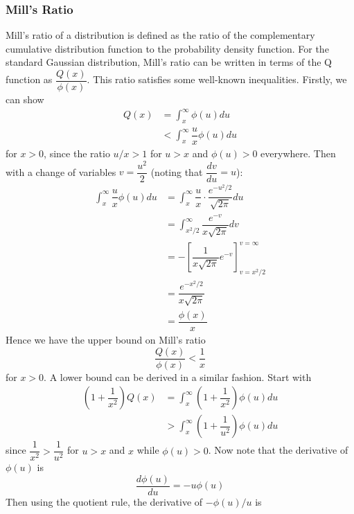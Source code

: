 \documentclass[11pt]{report} %
\begin{document}
\subsubsection{Mill's Ratio}

Mill's ratio of a distribution is defined as the ratio of the complementary cumulative distribution function to the probability density function. For the standard Gaussian distribution, Mill's ratio can be written in terms of the Q function as $\dfrac{Q\left(x\right)}{\phi\left(x\right)}$. This ratio satisfies some well-known inequalities. Firstly, we can show
\begin{align}
Q\left(x\right) &= \int_{x}^{\infty}\phi\left(u\right)du \\
& < \int_{x}^{\infty}\dfrac{u}{x}\phi\left(u\right)du
\end{align}
for $x > 0$, since the ratio $u/x > 1$ for $u > x$ and $\phi\left(u\right) > 0$ everywhere. Then with a change of variables $v = \dfrac{u^{2}}{2}$ (noting that $\dfrac{dv}{du} = u$):
\begin{align}
\int_{x}^{\infty}\dfrac{u}{x}\phi\left(u\right)du &= \int_{x}^{\infty}\dfrac{u}{x}\cdot \dfrac{e^{-u^{2}/2}}{\sqrt{2\pi}}du \\
&= \int_{x^{2}/2}^{\infty}\dfrac{e^{-v}}{x\sqrt{2\pi}}dv \\
&= -\left[\dfrac{1}{x\sqrt{2\pi}}e^{-v}\right]_{v=x^{2}/2}^{v = \infty} \\
&= \dfrac{e^{-x^{2}/2}}{x\sqrt{2\pi}} \\
&= \dfrac{\phi\left(x\right)}{x}
\end{align}
Hence we have the upper bound on Mill's ratio
\begin{equation}
\dfrac{Q\left(x\right)}{\phi\left(x\right)} < \dfrac{1}{x}
\end{equation}
for $x > 0$. A lower bound can be derived in a similar fashion. Start with
\begin{align}
\left(1 + \dfrac{1}{x^{2}}\right)Q\left(x\right) &= \int_{x}^{\infty}\left(1 + \dfrac{1}{x^{2}}\right)\phi\left(u\right)du \\
&> \int_{x}^{\infty}\left(1 + \dfrac{1}{u^{2}}\right)\phi\left(u\right)du
\end{align}
since $\dfrac{1}{x^{2}} > \dfrac{1}{u^{2}}$ for $u > x$ and $x$ while $\phi\left(u\right) > 0$. Now note that the derivative of $\phi\left(u\right)$ is
\begin{equation}
\dfrac{d\phi\left(u\right)}{du} = -u\phi\left(u\right)
\end{equation}
Then using the quotient rule, the derivative of $-\phi\left(u\right)/u$ is
\end{document}
